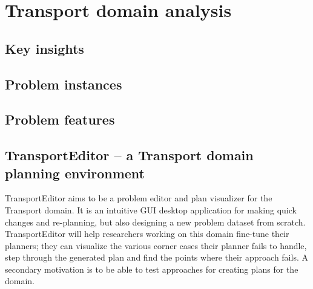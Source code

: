 \chapter{Transport domain analysis}

\section{Key insights}


\section{Problem instances}


\section{Problem features}


\section{TransportEditor -- a Transport domain planning environment}

TransportEditor aims to be a problem editor and plan visualizer for the Transport domain.
It is an intuitive GUI desktop application for making quick changes and re-planning, but also designing a new problem dataset from scratch. TransportEditor will help researchers working on this domain fine-tune their planners; they can visualize the various corner cases their planner fails to handle, step through the generated plan and find the points where their approach fails.
A secondary motivation is to be able to test approaches for creating plans for the domain.

